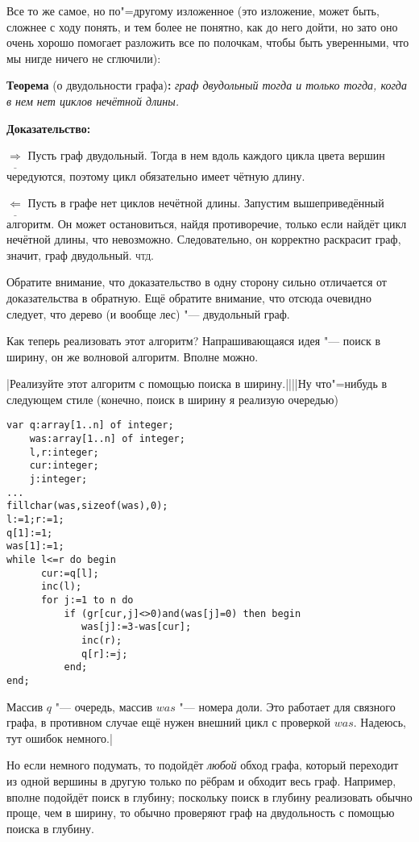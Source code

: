 Все то же самое, но по"=другому изложенное (это изложение, может быть, сложнее с ходу понять, и тем 
более не понятно, как до него дойти, но зато оно очень хорошо помогает разложить все по полочкам, 
чтобы быть уверенными, что мы нигде ничего не сглючили):

\textbf{Теорема} (о двудольности графа)\textbf{:} \textit{граф двудольный тогда и только тогда, когда в нем 
нет циклов нечётной длины.}

\textbf{Доказательство:}

$\underline{\Rightarrow}$ Пусть граф двудольный. Тогда в нем вдоль каждого цикла цвета вершин 
чередуются, поэтому цикл обязательно имеет чётную длину.

$\underline{\Leftarrow}$ Пусть в графе нет циклов нечётной длины. Запустим вышеприведённый 
алгоритм. Он может остановиться, найдя противоречие, только если найдёт цикл нечётной длины, что 
невозможно. Следовательно, он корректно раскрасит граф, значит, граф двудольный. \textsc{чтд.}

Обратите внимание, что доказательство в одну сторону сильно отличается от доказательства в 
обратную. Ещё обратите внимание, что отсюда очевидно следует, что дерево (и вообще лес) "--- 
двудольный граф.

\vspace{0.2cm}


Как теперь реализовать этот алгоритм? Напрашивающаяся идея "--- поиск в ширину, он же волновой 
алгоритм. Вполне можно. 

\task|Реализуйте этот алгоритм с помощью поиска в ширину.||||Ну что"=нибудь в следующем стиле (конечно, поиск в ширину я реализую очередью)
\begin{codesample}\begin{verbatim}
var q:array[1..n] of integer;
    was:array[1..n] of integer;
    l,r:integer;
    cur:integer;
    j:integer;
...
fillchar(was,sizeof(was),0);
l:=1;r:=1;
q[1]:=1;
was[1]:=1;
while l<=r do begin
      cur:=q[l];
      inc(l);
      for j:=1 to n do
          if (gr[cur,j]<>0)and(was[j]=0) then begin
             was[j]:=3-was[cur];
             inc(r);
             q[r]:=j;
          end;
end;
\end{verbatim}
\end{codesample}
Массив $q$ "--- очередь, массив $was$ "--- номера доли. Это работает для связного графа, в противном случае ещё
нужен внешний цикл с проверкой $was$. Надеюсь, тут ошибок немного.|\label{BFS:bipartie}

Но если немного подумать, то подойдёт \textit{любой} обход  графа, который переходит из одной 
вершины в другую только по рёбрам и обходит весь граф. Например, вполне подойдёт поиск в глубину; 
поскольку поиск в глубину реализовать обычно проще, чем в ширину, то обычно проверяют граф на 
двудольность с помощью поиска в глубину.

